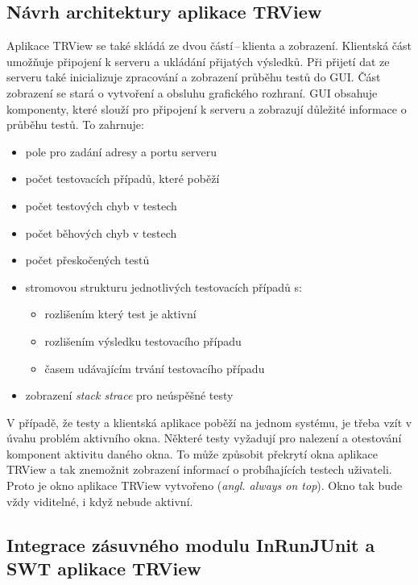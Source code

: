     \subsection{Návrh architektury aplikace TRView}
    Aplikace TRView se také skládá ze dvou částí\,--\,klienta a zobrazení. Klientská část umožňuje připojení k serveru a ukládání přijatých výsledků. Při přijetí dat ze serveru také inicializuje zpracování a zobrazení průběhu testů do GUI. Část zobrazení se stará o vytvoření a obsluhu grafického rozhraní. GUI obsahuje komponenty, které slouží pro připojení k serveru a zobrazují důležité informace o průběhu testů. To zahrnuje:
    \begin{itemize}
     \item pole pro zadání adresy a portu serveru
     \item počet testovacích případů, které poběží
     \item počet testových chyb v testech
     \item počet běhových chyb v testech
     \item počet přeskočených testů
     \item stromovou strukturu jednotlivých testovacích případů s:
     \begin{itemize}
      \item rozlišením který test je aktivní
      \item rozlišením výsledku testovacího případu
      \item časem udávajícím trvání testovacího případu
     \end{itemize}
     \item zobrazení \emph{stack strace} pro neúspěšné testy
    \end{itemize}

    V případě, že testy a klientská aplikace poběží na jednom systému, je třeba vzít v úvahu problém aktivního okna. Některé testy vyžadují pro nalezení a otestování komponent aktivitu daného okna. To může způsobit překrytí okna aplikace TRView a tak znemožnit zobrazení informací o probíhajících testech uživateli. Proto je okno aplikace TRView vytvořeno (\emph{angl. always on top}). Okno tak bude vždy viditelné, i když nebude aktivní.

    \subsection{Integrace zásuvného modulu InRunJUnit a SWT aplikace TRView}

